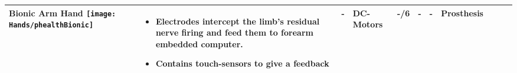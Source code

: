 \documentclass[main]{subfiles}
\begin{document}
\begin{longtable}{@{}p{6cm}p{4cm}p{0.7cm}p{1.2cm}p{1cm}p{1cm}p{1cm}p{1cm}p{1cm}p{1cm}p{2cm}@{}}
Bionic Arm Hand  \newline
\texttt{[image: Hands/phealthBionic]}&
\begin{itemize}\itemsep0em
\item Electrodes intercept the limb's residual nerve firing and feed them to forearm embedded computer.
\item Contains touch-sensors to give a feedback
\end{itemize} 
& - & DC-Motors & -/6 & - & -  & Prosthesis\\

 
\bottomrule
\end{longtable}
\normalsize
\end{document}
